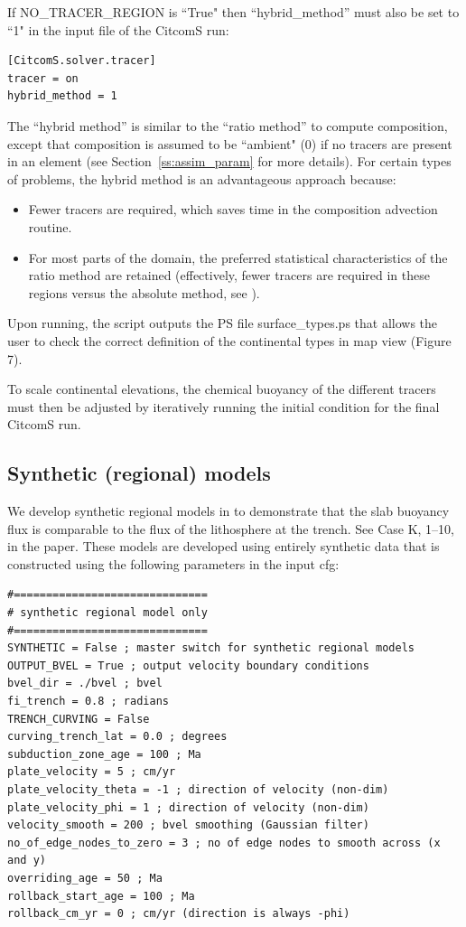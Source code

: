 \documentclass[letterpaper,12pt]{article}
\begin{document}
If NO\_TRACER\_REGION is ``True" then ``hybrid\_method'' must also be set to ``1" in the input file of the CitcomS run:

\begin{verbatim}
[CitcomS.solver.tracer]
tracer = on
hybrid_method = 1
\end{verbatim}

The ``hybrid method'' is similar to the ``ratio method'' \citep[see][]{TK03}  to compute composition, except that composition is assumed to be ``ambient" (0) if no tracers are present in an element (see Section~\ref{ss:assim_param} for more details).  For certain types of problems, the hybrid method is an advantageous approach because:
\begin{itemize}
\item Fewer tracers are required, which saves time in the composition advection routine.
\item For most parts of the domain, the preferred statistical characteristics of the ratio method are retained (effectively, fewer tracers are required in these regions versus the absolute method, see \cite{TK03}).
\end{itemize}

Upon running, the script outputs the PS file surface\_types.ps that allows the user to check the correct definition of the continental types in map view (Figure 7).

To scale continental elevations, the chemical buoyancy of the different tracers must then be adjusted by iteratively running the initial condition for the final CitcomS run.

\subsection{Synthetic (regional) models}
We develop synthetic regional models in \cite{BGF15} to demonstrate that the slab buoyancy flux is comparable to the flux of the lithosphere at the trench.  See Case K, 1--10, in the paper.  These models are developed using entirely synthetic data that is constructed using the following parameters in the input cfg:

\begin{verbatim}
#==============================
# synthetic regional model only
#==============================
SYNTHETIC = False ; master switch for synthetic regional models
OUTPUT_BVEL = True ; output velocity boundary conditions
bvel_dir = ./bvel ; bvel
fi_trench = 0.8 ; radians
TRENCH_CURVING = False
curving_trench_lat = 0.0 ; degrees
subduction_zone_age = 100 ; Ma
plate_velocity = 5 ; cm/yr
plate_velocity_theta = -1 ; direction of velocity (non-dim)
plate_velocity_phi = 1 ; direction of velocity (non-dim)
velocity_smooth = 200 ; bvel smoothing (Gaussian filter)
no_of_edge_nodes_to_zero = 3 ; no of edge nodes to smooth across (x and y)
overriding_age = 50 ; Ma
rollback_start_age = 100 ; Ma
rollback_cm_yr = 0 ; cm/yr (direction is always -phi)
\end{verbatim}
\end{document}
